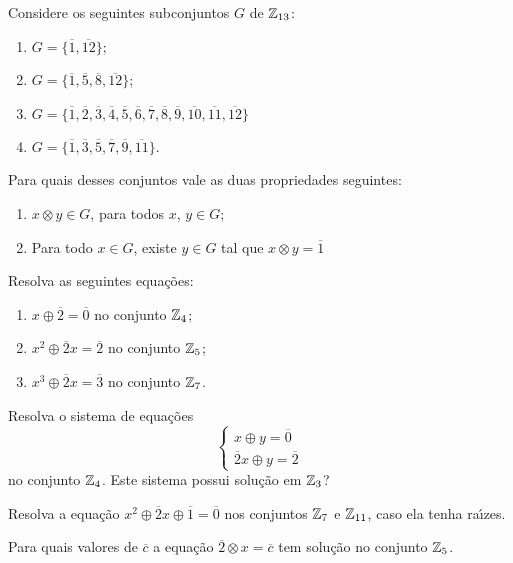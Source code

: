 \documentclass[12pt]{article}
\begin{document}
\vesp

\questao Considere os seguintes subconjuntos $G$ de $\mathbb{Z}_{13}$:
\begin{multicols}{2}
	\begin{enumerate}[label=({\alph*})]
		\item $G=\{\overline{1},\overline{12}\}$;

		\item $G=\{\overline{1},\overline{5},\overline{8},\overline{12}\}$;

		\item $G=\{\overline{1},\overline{2},\overline{3},\overline{4}, \overline{5},\overline{6},\overline{7},
		 \overline{8},\overline{9},\overline{10},\overline{11},\overline{12}\}$
		\item $G=\{\overline{1}, \overline{3},\overline{5},\overline{7},\overline{9},\overline{11}\}$.
	\end{enumerate}
\end{multicols}

Para quais desses conjuntos vale as duas propriedades seguintes:
\begin{enumerate}[label=({\roman*})]
	\item $x \otimes y \in G$, para todos $x$, $y \in G$;
	\item Para todo $x \in G$, existe $y \in G$ tal que $x \otimes y = \overline{1}$
\end{enumerate}

\vesp

\questao Resolva as seguintes equa\c{c}\~oes:
\begin{enumerate}[label={\alph*})]
	\item $x \oplus \overline{2} = \overline{0}$ no conjunto $\mathbb{Z}_4$;
	\item $x^2 \oplus \overline{2}x = \overline{2}$ no conjunto $\mathbb{Z}_5$;
	\item $x^3 \oplus \overline{2}x = \overline{3}$ no conjunto $\mathbb{Z}_7$.
\end{enumerate}

\vesp

\questao Resolva o sistema de equa\c{c}\~oes
  \[
    \begin{cases}
      x \oplus y = \overline{0}\\
      \overline{2}x \oplus y = \overline{2}
    \end{cases}
  \]
no conjunto $\mathbb{Z}_4$. Este sistema possui solu\c{c}\~ao em $\mathbb{Z}_3$?

\vesp

\questao Resolva a equa\c{c}\~ao $x^2 \oplus \overline{2}x \oplus \overline{1} = \overline{0}$ nos conjuntos $\mathbb{Z}_7$ e $\mathbb{Z}_{11}$, caso ela tenha ra{\'\i}zes.

\vesp

\questao Para quais valores de $\overline{c}$ a equa\c{c}\~ao $\overline{2}\otimes x = \overline{c}$ tem solu\c{c}\~ao no conjunto $\mathbb{Z}_5$.
\end{document}
